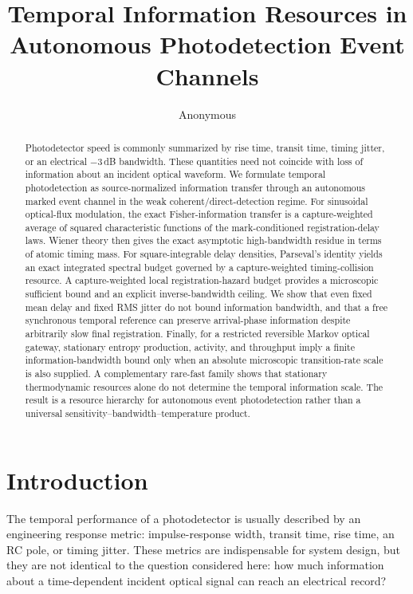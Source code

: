 \documentclass[aps,prapplied,preprint,nofootinbib]{revtex4-2}
\begin{document}
\title{Temporal Information Resources in Autonomous Photodetection Event Channels}
\author{Anonymous}

\begin{abstract}
Photodetector speed is commonly summarized by rise time, transit time, timing jitter, or an electrical $-3\,$dB bandwidth. These quantities need not coincide with loss of information about an incident optical waveform. We formulate temporal photodetection as source-normalized information transfer through an autonomous marked event channel in the weak coherent/direct-detection regime. For sinusoidal optical-flux modulation, the exact Fisher-information transfer is a capture-weighted average of squared characteristic functions of the mark-conditioned registration-delay laws. Wiener theory then gives the exact asymptotic high-bandwidth residue in terms of atomic timing mass. For square-integrable delay densities, Parseval's identity yields an exact integrated spectral budget governed by a capture-weighted timing-collision resource. A capture-weighted local registration-hazard budget provides a microscopic sufficient bound and an explicit inverse-bandwidth ceiling. We show that even fixed mean delay and fixed RMS jitter do not bound information bandwidth, and that a free synchronous temporal reference can preserve arrival-phase information despite arbitrarily slow final registration. Finally, for a restricted reversible Markov optical gateway, stationary entropy production, activity, and throughput imply a finite information-bandwidth bound only when an absolute microscopic transition-rate scale is also supplied. A complementary rare-fast family shows that stationary thermodynamic resources alone do not determine the temporal information scale. The result is a resource hierarchy for autonomous event photodetection rather than a universal sensitivity--bandwidth--temperature product.
\end{abstract}

\maketitle

\section{Introduction}

The temporal performance of a photodetector is usually described by an engineering response metric: impulse-response width, transit time, rise time, an RC pole, or timing jitter. These metrics are indispensable for system design, but they are not identical to the question considered here: how much information about a time-dependent incident optical signal can reach an electrical record?
\end{document}
